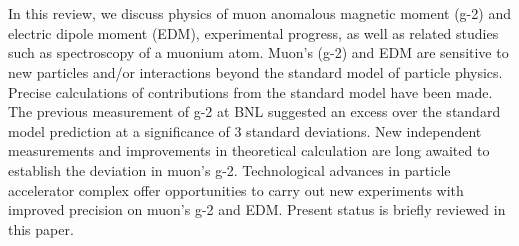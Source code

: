 \section{}
In this review, we discuss physics of muon anomalous magnetic moment (g-2) and electric dipole moment (EDM), experimental progress, as well as related studies such as spectroscopy of a muonium atom. Muon's (g-2) and EDM are sensitive to new particles and/or interactions beyond the standard model of particle physics. Precise calculations of contributions from the standard model have been made. The previous measurement of g-2 at BNL suggested an excess over the standard model prediction at a significance of 3 standard deviations. New independent measurements and improvements in theoretical calculation are long awaited to establish the deviation in muon’s g-2. Technological advances in particle accelerator complex offer opportunities to carry out new experiments with improved precision on muon’s g-2 and EDM. Present status is briefly reviewed in this paper. 
